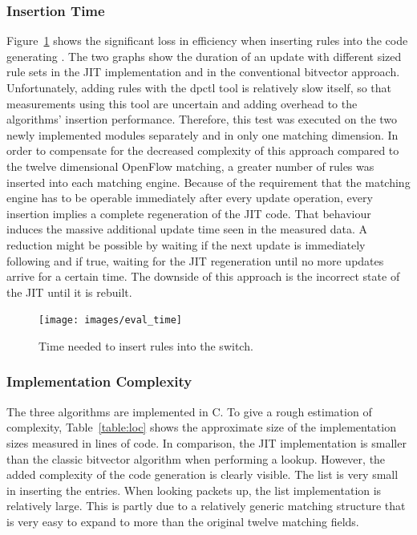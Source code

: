 \documentclass[a4paper,
		12pt,
		parskip=full,
		titlepage
		]{scrartcl}
\begin{document}
\subsubsection{Insertion Time}
\label{sec:eval-ins}
Figure~\ref{fig:eval-times} shows the significant loss in efficiency when inserting rules into the code generating .
The two graphs show the duration of an update with different sized rule sets in the JIT implementation and in the conventional bitvector approach.
Unfortunately, adding rules with the \textsf{dpctl} tool is relatively slow itself, so that measurements using this tool
are uncertain and adding overhead to the algorithms' insertion performance.
Therefore, this test was executed on the two newly implemented modules separately and in only one matching dimension.
In order to compensate for the decreased complexity of this approach compared to the twelve dimensional OpenFlow matching,
a greater number of rules was inserted into each matching engine.
Because of the requirement that the matching engine has to be operable 
immediately after every update operation, every insertion implies a complete regeneration of the JIT code.
That behaviour induces the massive additional update time seen in the measured data.
A reduction might be possible by waiting if the next update is immediately following
and if true, waiting for the JIT regeneration until no more updates arrive for a certain time.
The downside of this approach is the incorrect state of the JIT until it is rebuilt.

\begin{figure}
\centering
\texttt{[image: images/eval\_time]}
\caption{Time needed to insert rules into the switch.}
\label{fig:eval-times}
\end{figure}

\subsubsection{Implementation Complexity}
The three algorithms are implemented in C.
To give a rough estimation of complexity, Table~\ref{table:loc} shows the 
approximate size of the implementation sizes measured in lines of code.
In comparison, the JIT implementation is smaller than the classic bitvector algorithm when performing a lookup.
However, the added complexity of the code generation is clearly visible.
The list is very small in inserting the entries.
When looking packets up, the list implementation is relatively large.
This is partly due to a relatively generic matching structure that is very 
easy to expand to more than the original twelve matching fields.
\end{document}
